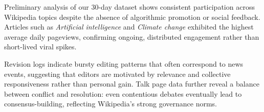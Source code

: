 
\label{sec:results}

Preliminary analysis of our 30-day dataset shows consistent participation across Wikipedia topics despite the absence of algorithmic promotion or social feedback. Articles such as \textit{Artificial intelligence} and \textit{Climate change} exhibited the highest average daily pageviews, confirming ongoing, distributed engagement rather than short-lived viral spikes.

Revision logs indicate bursty editing patterns that often correspond to news events, suggesting that editors are motivated by relevance and collective responsiveness rather than personal gain. Talk page data further reveal a balance between conflict and resolution: even contentious debates eventually lead to consensus-building, reflecting Wikipedia’s strong governance norms.
